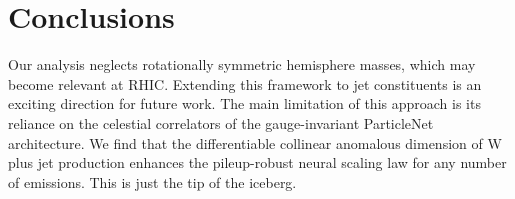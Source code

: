 \section{Conclusions}\label{sec:conclusions}

Our analysis neglects rotationally symmetric hemisphere masses, which
may become relevant at RHIC. Extending this framework to jet
constituents is an exciting direction for future work. The main
limitation of this approach is its reliance on the celestial correlators
of the gauge-invariant ParticleNet architecture. We find that the
differentiable collinear anomalous dimension of W plus jet production
enhances the pileup-robust neural scaling law for any number of
emissions. This is just the tip of the iceberg.

